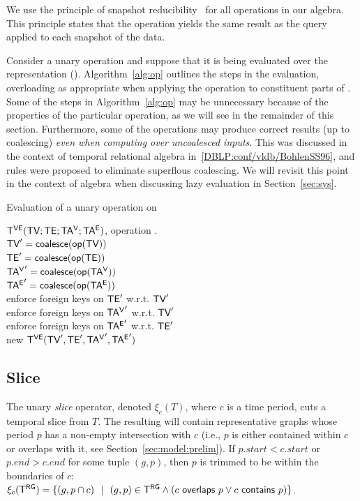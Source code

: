 We use the principle of snapshot
reducibility~\cite{DBLP:reference/db/Bohlen092} for all operations in
our algebra.  This principle states that the operation yields the same
result as the query applied to each snapshot of the data.

Consider a unary operation \op and suppose that it is being evaluated
over the \ve representation \op(\tve).  Algorithm~\ref{alg:op}
outlines the steps in the evaluation, overloading \opp as appropriate
when applying the operation to constituent parts of \tve.  Some of the
steps in Algorithm~\ref{alg:op} may be unnecessary because of the
properties of the particular operation, as we will see in the
remainder of this section.  Furthermore, some of the operations may
produce correct results (up to coalescing) {\em even when computing
  over uncoalesced inputs}.  This was discussed in the context of
temporal relational algebra in~\ref{DBLP:conf/vldb/BohlenSS96}, and
rules were proposed to eliminate superflous coalescing. We will
revisit this point in the context of \tg algebra when discussing lazy
evaluation in Section~\ref{sec:sys}.

\begin{algorithm}[h!]
\caption{Evaluation of a unary operation on \tve}
\begin{algorithmic}[1]
\REQUIRE \tg $\mathsf{T^{VE}} (\textsf{TV}; \textsf{TE}; \mathsf{TA^{V}}; \mathsf{TA^{E}})$, operation .\\
\STATE  $\textsf{TV}' = \textsf{coalesce} (\textsf{op}(\textsf{TV}))$\\
\STATE  $\textsf{TE}' = \textsf{coalesce} (\textsf{op}(\textsf{TE}))$\\
\STATE  $\mathsf{TA^{V}}' = \textsf{coalesce} (\textsf{op}(\mathsf{TA^{V}}))$\\
\STATE  $\mathsf{TA^{E}}' = \textsf{coalesce} (\textsf{op}(\mathsf{TA^{E}}))$\\
\STATE  enforce foreign keys on $\textsf{TE}'$ w.r.t. $\textsf{TV}'$\\
\STATE  enforce foreign keys on $\mathsf{TA^{V}}'$ w.r.t. $\textsf{TV}'$\\
\STATE  enforce foreign keys on $\mathsf{TA^{E}}'$ w.r.t. $\textsf{TE}'$\\
\RETURN new $\mathsf{T^{VE}} (\textsf{TV}', \textsf{TE}', \mathsf{TA^{V}}', \mathsf{TA^{E}}')$\\
\end{algorithmic}
\label{alg:op}
\end{algorithm}

\subsection{Slice}
\label{sec:algebra:slice}

The unary {\em slice} operator, denoted $\xi_c (T)$, where $c$ is a
time period, cuts a temporal slice from $T$.  The resulting \tg will
contain representative graphs whose period $p$ has a non-empty
intersection with $c$ (i.e., $p$ is either contained within $c$ or
overlaps with it, see Section~\ref{sec:model:prelim}).  If $p.start <
c.start$ or $p.end > c.end$ for some tuple $(g, p)$, then $p$ is
trimmed to be within the boundaries of $c$: $\xi_c (\mathsf{T^{RG}}) = \{ (g, p
\cap c)~~|~~(g, p) \in \mathsf{T^{RG}} \wedge (c~\mathsf{overlaps}~p \vee
c~\mathsf{contains}~p)\}$.

